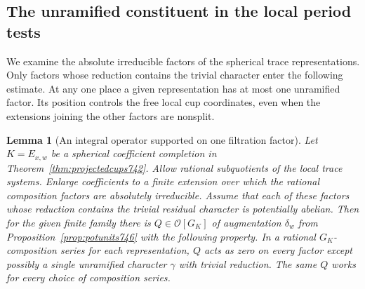 \documentclass[a4paper,11pt]{article}
\newtheorem{lemma}[proposition]{Lemma}
\theoremstyle{definition}
\theoremstyle{remark}
\numberwithin{equation}{section}
\begin{document}
\subsection{The unramified constituent in the local period tests}
\label{sec:unramifiedfactor758}
We examine the absolute irreducible factors of the spherical
trace representations. Only factors whose reduction contains
the trivial character enter the following estimate. At any
one place a given representation has at most one unramified
factor. Its position controls the free local cup coordinates,
even when the extensions joining the other factors are nonsplit.

\begin{lemma}[An integral operator supported on one filtration factor]
\leavevmode\label{lem:unramifiedfactor758}
Let \(K=E_{x,w}\) be a spherical coefficient completion in
Theorem~\ref{thm:projectedcups742}. Allow rational subquotients
of the local trace systems. Enlarge coefficients to a finite
extension over which the rational composition factors are
absolutely irreducible. Assume that each of these factors
whose reduction contains the trivial residual character is
potentially abelian. Then for the given finite family there
is \(Q\in\mathcal O[G_K]\) of augmentation \(\delta_w\) from
Proposition~\ref{prop:potunits746} with the following property.
In a rational \(G_K\)-composition series for each representation,
\(Q\) acts as zero on every factor except possibly a single
unramified character \(\gamma\) with trivial reduction. The
same \(Q\) works for every choice of composition series.
\end{lemma}
\end{document}
